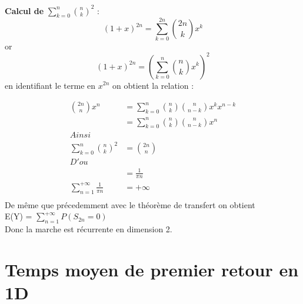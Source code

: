 \documentclass{article}
\theoremstyle{definition}
\begin{document}
\textbf{Calcul de} $\sum_{k=0}^{n} \binom{n}{k}^2$ : \\

\begin{equation*}
(1+x)^{2n} = \sum_{k=0}^{2n} \binom{2n}{k} x^k
\end{equation*}
 or 
 \begin{equation*}
 (1+x)^{2n} = ( \sum_{k=0}^{n} \binom{n}{k} x^k )^2
\end{equation*}
en identifiant le terme en $x^{2n}$ on obtient la relation :

\begin{align*}
\binom{2n}{n} x^n &=  \sum_{k=0}^{n} \binom{n}{k} \binom{n}{n-k} x^k x^{n-k} \\
 &= \sum_{k=0}^{n} \binom{n}{k} \binom{n}{n-k} x^n \\
 Ainsi \\
 \sum_{k=0}^{n} \binom{n}{k}^2 &= \binom{2n}{n} \\
 D'ou \\
 &= \frac{1}{\pi n} \\
 \sum_{n=1}^{+\infty} \frac{1}{\pi n} &= + \infty \\
 \end{align*} 
De même que précedemment avec le théorème de transfert on obtient \\
E(Y) = $\sum_{n=1}^{+\infty} P(S_{2n} = 0)$ \\
Donc la marche est récurrente en dimension 2.

\section{Temps moyen de premier retour en 1D}
\end{document}
